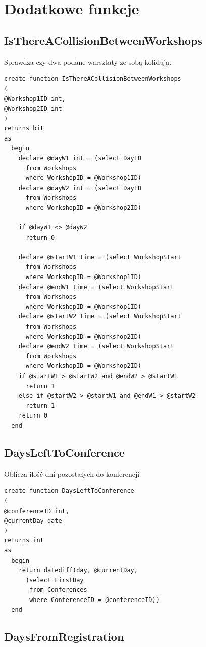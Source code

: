 \documentclass[12pt, a4paper]{mwrep}
\begin{document}
\newpage
\section{Dodatkowe funkcje}

\subsection{IsThereACollisionBetweenWorkshops}

\noindent Sprawdza czy dwa podane warsztaty ze sobą kolidują.
\begin{lstlisting}
create function IsThereACollisionBetweenWorkshops
(
@Workshop1ID int,
@Workshop2ID int
)
returns bit
as
  begin
    declare @dayW1 int = (select DayID
      from Workshops
      where WorkshopID = @Workshop1ID)
    declare @dayW2 int = (select DayID
      from Workshops
      where WorkshopID = @Workshop2ID)

    if @dayW1 <> @dayW2
      return 0

    declare @startW1 time = (select WorkshopStart
      from Workshops
      where WorkshopID = @Workshop1ID)
    declare @endW1 time = (select WorkshopStart
      from Workshops
      where WorkshopID = @Workshop1ID)
    declare @startW2 time = (select WorkshopStart
      from Workshops
      where WorkshopID = @Workshop2ID)
    declare @endW2 time = (select WorkshopStart
      from Workshops
      where WorkshopID = @Workshop2ID)
    if @startW1 > @startW2 and @endW2 > @startW1
      return 1
    else if @startW2 > @startW1 and @endW1 > @startW2
      return 1
    return 0
  end
\end{lstlisting}

\subsection{DaysLeftToConference}

\noindent Oblicza ilość dni pozostałych do konferencji
\begin{lstlisting}
create function DaysLeftToConference
(
@conferenceID int,
@currentDay date
)
returns int
as
  begin
    return datediff(day, @currentDay,
      (select FirstDay 
       from Conferences 
       where ConferenceID = @conferenceID))
  end
\end{lstlisting}

\subsection{DaysFromRegistration}
\end{document}
